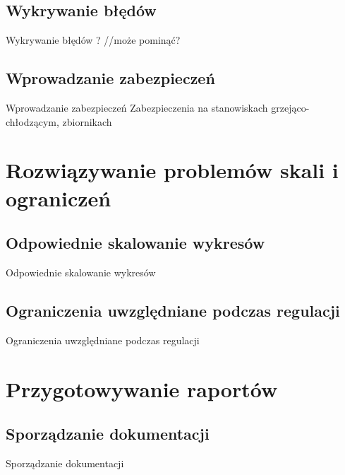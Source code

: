 \documentclass{beamer}
\begin{document}
	\subsection{Wykrywanie błędów}
	\begin{frame}{Wykrywanie błędów}
		? //może pominąć?
	\end{frame}
	
	\subsection{Wprowadzanie zabezpieczeń}
	\begin{frame}{Wprowadzanie zabezpieczeń}
		Zabezpieczenia na stanowiskach grzejąco-chłodzącym, zbiornikach
	\end{frame}

\section{Rozwiązywanie problemów skali i ograniczeń}

	\subsection{Odpowiednie skalowanie wykresów}
	\begin{frame}{Odpowiednie skalowanie wykresów}
		
	\end{frame}
	
	\subsection{Ograniczenia uwzględniane podczas regulacji}
	\begin{frame}{Ograniczenia uwzględniane podczas regulacji}
		
	\end{frame}

\section{Przygotowywanie raportów}

	\subsection{Sporządzanie dokumentacji}
	\begin{frame}{Sporządzanie dokumentacji}
		
	\end{frame}
\end{document}
